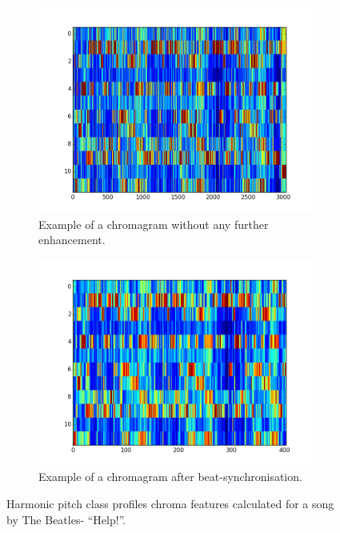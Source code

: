 \begin{figure}
        \centering
        \begin{subfigure}{0.47\textwidth}
                \includegraphics[width=\textwidth]{Figures/hpcp_unsynched_chroma}
                \caption{Example of a chromagram without any further enhancement. }
                \label{fig:unchroma}
        \end{subfigure}
        \begin{subfigure}{0.47\textwidth}
                \includegraphics[width=\textwidth]{Figures/hpcp_synched_chroma}
                \caption{Example of a chromagram after beat-synchronisation.}
                \label{fig:synchroma}
        \end{subfigure}
          \caption{Harmonic pitch class profiles chroma features calculated for a song by The Beatles- ``Help!''.}
        \label{fig:chromacomparison}
\end{figure}

